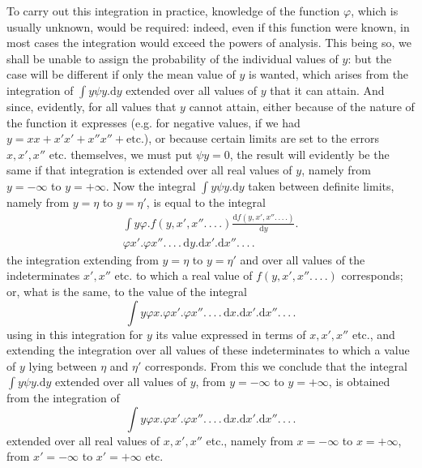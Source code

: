 To carry out this integration in practice, knowledge of the function \(\varphi\), which is usually unknown, would be required: indeed, even if this function were known, in most cases the integration would exceed the powers of analysis. This being so, we shall be unable to assign the probability of the individual values of \(y\): but the case will be different if only the mean value of \(y\) is wanted, which arises from the integration of \(\int y\psi y.\mathrm{d}y\) extended over all values of \(y\) that it can attain. And since, evidently, for all values that \(y\) cannot attain, either because of the nature of the function it expresses (e.g. for negative values, if we had \(y=xx+x'x'+x''x''+\text{etc.}\)), or because certain limits are set to the errors \(x,x',x''\) etc. themselves, we must put \(\psi y=0\), the result will evidently be the same if that integration is extended over all real values of \(y\), namely from \(y=-\infty\) to \(y=+\infty\). Now the integral \(\int y\psi y.\mathrm{d}y\) taken between definite limits, namely from \(y=\eta\) to \(y=\eta'\), is equal to the integral
\[
\begin{aligned}
\int y\varphi.f(y,x',x''\mathord{.}\,\mathord{.}\,\mathord{.}\,\mathord{.})\frac{\mathrm{d}f(y,x',x''\mathord{.}\,\mathord{.}\,\mathord{.}\,\mathord{.})}{\mathrm{d}y}.{}\\
\varphi x'.\varphi x''\mathord{.}\,\mathord{.}\,\mathord{.}\,\mathord{.}\,\mathrm{d}y.\mathrm{d}x'.\mathrm{d}x''\mathord{.}\,\mathord{.}\,\mathord{.}\,\mathord{.}
\end{aligned}
\]
the integration extending from \(y=\eta\) to \(y=\eta'\) and over all values of the indeterminates \(x',x''\) etc. to which a real value of \(f(y,x',x''\mathord{.}\,\mathord{.}\,\mathord{.}\,\mathord{.})\) corresponds; or, what is the same, to the value of the integral
\[
\int y\varphi x.\varphi x'.\varphi x''\mathord{.}\,\mathord{.}\,\mathord{.}\,\mathord{.}\,\mathrm{d}x.\mathrm{d}x'.\mathrm{d}x''\mathord{.}\,\mathord{.}\,\mathord{.}\,\mathord{.}
\]
using in this integration for \(y\) its value expressed in terms of \(x,x',x''\) etc., and extending the integration over all values of these indeterminates to which a value of \(y\) lying between \(\eta\) and \(\eta'\) corresponds. From this we conclude that the integral \(\int y\psi y.\mathrm{d}y\) extended over all values of \(y\), from \(y=-\infty\) to \(y=+\infty\), is obtained from the integration of
\[
\int y\varphi x.\varphi x'.\varphi x''\mathord{.}\,\mathord{.}\,\mathord{.}\,\mathord{.}\,\mathrm{d}x.\mathrm{d}x'.\mathrm{d}x''\mathord{.}\,\mathord{.}\,\mathord{.}\,\mathord{.}
\]
extended over all real values of \(x,x',x''\) etc., namely from \(x=-\infty\) to \(x=+\infty\), from \(x'=-\infty\) to \(x'=+\infty\) etc.

\clearpage
